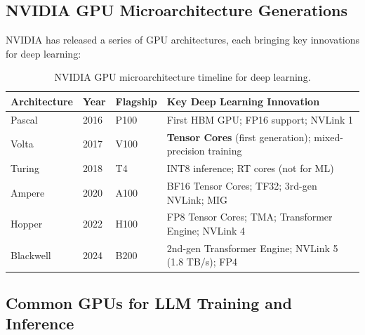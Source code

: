 \subsection{NVIDIA GPU Microarchitecture Generations}
\label{nvidia-gpu-microarchitecture-generations}

NVIDIA has released a series of GPU architectures, each bringing key innovations for deep learning:

\begin{table}[ht!]
\centering
\caption{NVIDIA GPU microarchitecture timeline for deep learning.}
\begin{tabular}{@{}lp{3.5cm}p{3.5cm}p{6cm}@{}}
\toprule
\textbf{Architecture} & \textbf{Year} & \textbf{Flagship} & \textbf{Key Deep Learning Innovation} \\
\midrule
Pascal & 2016 & P100 & First HBM GPU; FP16 support; NVLink 1 \\
Volta & 2017 & V100 & \textbf{Tensor Cores} (first generation); mixed-precision training \\
Turing & 2018 & T4 & INT8 inference; RT cores (not for ML) \\
Ampere & 2020 & A100 & BF16 Tensor Cores; TF32; 3rd-gen NVLink; MIG \\
Hopper & 2022 & H100 & FP8 Tensor Cores; TMA; Transformer Engine; NVLink 4 \\
Blackwell & 2024 & B200 & 2nd-gen Transformer Engine; NVLink 5 (1.8 TB/s); FP4 \\
\bottomrule
\end{tabular}
\end{table}

\subsection{Common GPUs for LLM Training and Inference}
\label{common-gpus-for-llm-training-and-inference}

